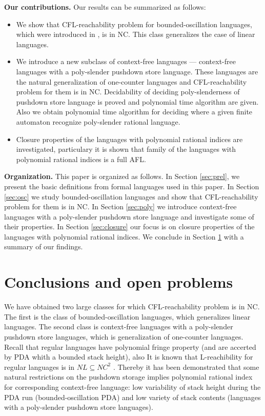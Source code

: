 \documentclass[smallextended]{svjour3}       %
\begin{document}
\textbf{Our contributions.} Our results can be summarized as follows:
\begin{itemize}
\item We show that CFL-reachability problem for bounded-oscillation languages, which were introduced in \cite{BoundOsc}, is in NC. This class generalizes the case of linear languages.
\item We introduce a new subclass of context-free languages --- context-free languages with a poly-slender pushdown store language. These languages are the natural generalization of one-counter languages and CFL-reachability problem for them is in NC. Decidability of deciding poly-slenderness of pushdown store language is proved and polynomial time algorithm are given. Also we obtain polynomial time algorithm for deciding where a given finite automaton recognize poly-slender rational language.  
\item Closure properties of the languages with polynomial rational indices are investigated, particulary it is shown that family of the languages with polynomial rational indices is a full AFL.
\end{itemize}


\textbf{Organization.} This paper is organized as follows. In Section \ref{sec:prel}, we present the basic definitions from formal languages used in this paper. In Section \ref{sec:osc} we study bounded-oscillation languages and show that CFL-reachability problem for them is in NC. In Section \ref{sec:poly} we introduce context-free languages with a poly-slender pushdown store language and investigate some of their properties. In Section \ref{sec:closure} our focus is on closure properties of the languages with polynomial rational indices. We conclude in Section \ref{sec:conc} with a summary of our findings.




\section{Conclusions and open problems}
\label{sec:conc}
We have obtained two large classes for which CFL-reachability problem is in NC. The first is the class of bounded-oscillation languages, which generalizes linear languages. The second class is 
context-free languages with a poly-slender pushdown store languages, which is generalization of one-counter languages. Recall that regular languages have polynomial fringe property (and are accerted by PDA whith a bounded stack height), also It is known that L-reachibility for regular languages is in $NL \subseteq NC^2$ \cite*{LReach, Yannakakis}. Thereby it has been demonstrated that some natural restrictions on the pushdown storage implies polynomial rational index for corresponding context-free language: low variability of stack height during the PDA run (bounded-oscillation PDA) and low variety of stack contents (languages with a poly-slender pushdown store languages). 
\end{document}
